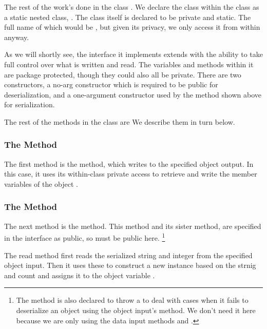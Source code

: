 The rest of the work's done in the class .  We
declare the class within the  class as a static
nested class, .  
%
%
The class itself is declared to be private and static.  The full name
of which would be
, but given its
privacy, we only access it from within  anyway.

As we will shortly see, the  interface it
implements extends  with the ability to take full
control over what is written and read.  The variables and methods
within it are package protected, though they could also all be
private.  There are two constructors, a no-arg constructor which is
required to be public for deserialization, and a one-argument
constructor used by the  method shown above for
serialization.

The rest of the methods in the  class are
%
%
We describe them in turn below.

\subsubsection{The  Method}

The first method is the  method, which writes to
the specified object output.  In this case, it uses its within-class
private access to retrieve and write the member variables of the
 object .  

\subsubsection{The  Method}

The next method is the  method.  This method
and its sister method,  are specified in
the  interface as public, so must be public here.%
%
\footnote{The  method is also declared to throw a
   to deal with cases when it fails to
  deserialize an object using the object input's 
  method.  We don't need it here because we are only using the data
  input methods  and .}

The read method first reads the serialized string and integer from the
specified object input.  Then it uses these to construct a new
 instance based on the strnig and count and
assigns it to the object variable .

